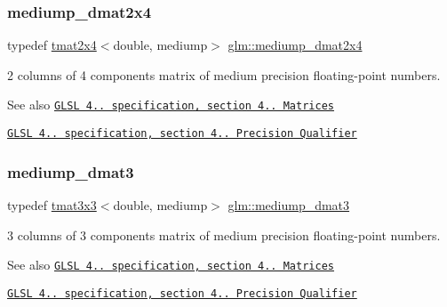 \subsubsection{\texorpdfstring{mediump\+\_\+dmat2x4}{mediump\_dmat2x4}}
{\footnotesize\ttfamily typedef \hyperlink{structglm_1_1tmat2x4}{tmat2x4}$<$double, mediump$>$ \hyperlink{group__core__precision_ga837b8ead9807e10740dddfc99dabe8d7}{glm\+::mediump\+\_\+dmat2x4}}

2 columns of 4 components matrix of medium precision floating-\/point numbers.

\begin{DoxySeeAlso}{See also}
\href{http://www.opengl.org/registry/doc/GLSLangSpec.4.20.8.pdf}{\tt G\+L\+SL 4.. specification, section 4.. Matrices} 

\href{http://www.opengl.org/registry/doc/GLSLangSpec.4.20.8.pdf}{\tt G\+L\+SL 4.. specification, section 4.. Precision Qualifier} 
\end{DoxySeeAlso}
\mbox{\label{group__core__precision_ga1a9a878d256cbb899a9c10bc7332995a}} 
\subsubsection{\texorpdfstring{mediump\+\_\+dmat3}{mediump\_dmat3}}
{\footnotesize\ttfamily typedef \hyperlink{structglm_1_1tmat3x3}{tmat3x3}$<$double, mediump$>$ \hyperlink{group__core__precision_ga1a9a878d256cbb899a9c10bc7332995a}{glm\+::mediump\+\_\+dmat3}}

3 columns of 3 components matrix of medium precision floating-\/point numbers.

\begin{DoxySeeAlso}{See also}
\href{http://www.opengl.org/registry/doc/GLSLangSpec.4.20.8.pdf}{\tt G\+L\+SL 4.. specification, section 4.. Matrices} 

\href{http://www.opengl.org/registry/doc/GLSLangSpec.4.20.8.pdf}{\tt G\+L\+SL 4.. specification, section 4.. Precision Qualifier} 
\end{DoxySeeAlso}
\mbox{\label{group__core__precision_ga5ad217fad4f08abe72401409595076f2}} 
